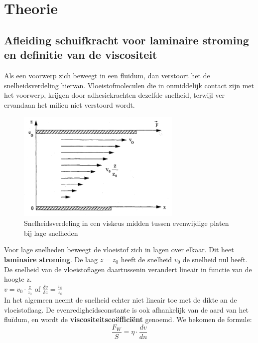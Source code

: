 \section{Theorie}

\subsection{Afleiding schuifkracht voor laminaire stroming en 
definitie van de viscositeit}

Als een voorwerp zich beweegt in een flu\"idum, dan verstoort het de snelheidsverdeling hiervan.
Vloeistofmoleculen die in onmiddelijk contact zijn met het voorwerp, krijgen door 
adhesiekrachten dezelfde snelheid, terwijl ver ervandaan het milieu niet verstoord wordt.\\

\begin{figure}[h]
    \centering
    \label{fig:snelheidsverdeling_laminair}
    \includegraphics[width=0.7\textwidth]{img/figuur_1_theorie.png}
    \caption{Snelheidsverdeling in een viskeus midden tussen evenwijdige platen bij lage snelheden}
\end{figure}

Voor lage snelheden beweegt de vloeistof zich in lagen over elkaar. Dit heet \textbf{laminaire stroming}.
De laag $z = z_{0}$ heeft de snelheid $v_{0}$ de snelheid nul heeft. De snelheid van de 
vloeistoflagen daartussenin verandert lineair in functie van de hoogte z.
\\

$v = v_{0} \cdot \frac{z}{z_{0}}$ of $\frac{\delta v}{\delta z} = \frac{v_{0}}{z_{0}}$
\\

In het algemeen neemt de snelheid echter niet lineair toe met de dikte an de vloeistoflaag. 
De evenredigheidsconstante is ook afhankelijk van de aard van het flu\"idum, en wordt de
\textbf{viscositeitsco\"effici\"ent} genoemd. We bekomen de formule:
$$\frac{F_{W}}{S} = \eta \cdot \frac{dv}{dn}$$

